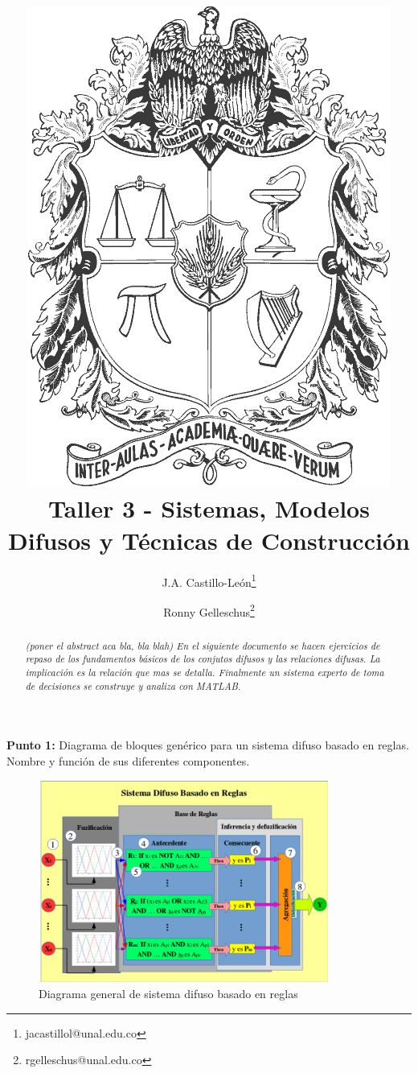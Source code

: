 \documentclass[10pt,onecolumn,twoside,letterpaper]{article}
\title{\vspace{-0.8cm}\includegraphics[scale=0.12]{unescudobn.png}\\\vspace{-0.0cm}
  \LARGE \textbf{Taller 3 - Sistemas, Modelos Difusos y T\'ecnicas de Construcci\'on}}
\author{J.A. Castillo-Le\'on\thanks{jacastillol@unal.edu.co} \and Ronny Gelleschus\thanks{rgelleschus@unal.edu.co}}
\date{}
\begin{document}
\maketitle
\begin{abstract}\noindent\small\textit{(poner el abstract aca bla, bla blah) En el siguiente documento se hacen ejercicios de repaso de los fundamentos b\'asicos de los conjutos difusos y las relaciones difusas. La implicaci\'on es la relaci\'on que mas se detalla. Finalmente un sistema experto de toma de decisiones se construye y analiza con MATLAB.}
\end{abstract}\vspace{1cm}


\par{\bf \large Punto 1:} Diagrama de bloques gen\'erico para un sistema difuso basado en reglas. Nombre y funci\'on de sus diferentes componentes.\\
\begin{figure}[!htb]
  \centering
  \includegraphics[width=0.85\textwidth]{Rule-BasedFuzzySystem02.png}
  \caption{Diagrama general de sistema difuso basado en reglas}
  \label{fig:ruleBasedSystem}
\end{figure}
\end{document}
